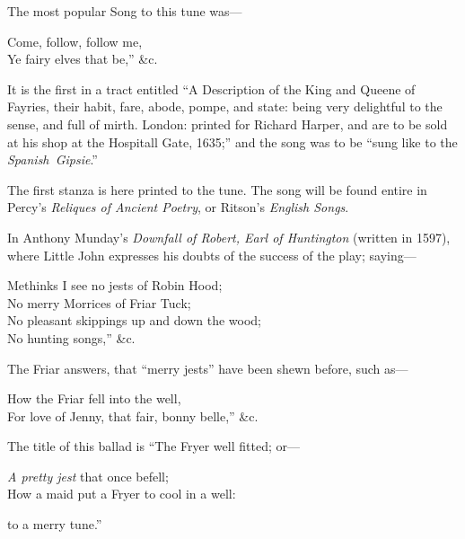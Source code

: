 The most popular Song to this tune was—
\settowidth{\versewidth}{Ye fairy elves that be,” \&c.}
\begin{scverse}
Come, follow, follow me,\\
Ye fairy elves that be,” \&c.
\end{scverse}
It is the first in a tract entitled “A Description of the King and Queene of
Fayries, their habit, fare, abode, pompe, and state: being very delightful to the
sense, and full of mirth. London: printed for Richard Harper, and are to be
sold at his shop at the Hospitall Gate, 1635;” and the song was to be “sung
like to the \textit{Spanish~Gipsie}.”

The first stanza is here printed to the tune. The song will be found entire in
Percy’s \textit{Reliques of Ancient Poetry}, or Ritson’s \textit{English Songs}.


\medskip



In Anthony Munday’s \textit{Downfall of Robert, Earl of Huntington} (written in
1597), where Little John expresses his doubts of the success of the play;
saying—
\settowidth{\versewidth}{No pleasant skippings up and down the wood;}
\begin{scverse}
\begin{altverse}
Methinks I see no jests of Robin Hood;\\
No merry Morrices of Friar Tuck;\\
No pleasant skippings up and down the wood;\\
No hunting songs,” \&c.
\end{altverse}
\end{scverse}
The Friar answers, that “merry jests” have been shewn before, such as—
\begin{scverse}
How the Friar fell into the well,\\
For love of Jenny, that fair, bonny belle,” \&c.
\end{scverse}
The title of this ballad is “The Fryer well fitted; or—
\begin{scverse}
\textit{A pretty jest} that once befell;\\
How a maid put a Fryer to cool in a well:
\end{scverse}
to a merry tune.”
\pagebreak

